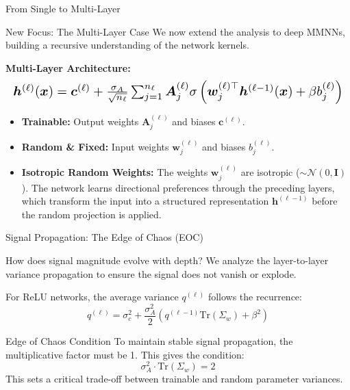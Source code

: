 \documentclass{beamer}
\begin{document}
\begin{frame}{From Single to Multi-Layer}
\begin{alertblock}{New Focus: The Multi-Layer Case}
We now extend the analysis to deep MMNNs, building a recursive understanding of the network kernels.
\end{alertblock}
\vspace{1em}
\textbf{Multi-Layer Architecture:}
\begin{equation*}
\resizebox{\hsize}{!}{$
\bm{h}^{(\ell)}(\bm{x}) = \bm{c}^{(\ell)} + \frac{\sigma_A}{\sqrt{n_\ell}} \sum_{j=1}^{n_\ell} \bm{A}_j^{(\ell)} \sigma\left(\bm{w}_j^{(\ell)\top} \bm{h}^{(\ell-1)}(\bm{x}) + \beta b_j^{(\ell)}\right)
$}
\end{equation*}
\begin{itemize}
    \item \textbf{Trainable:} Output weights $\bm{A}_j^{(\ell)}$ and biases $\bm{c}^{(\ell)}$.
    \item \textbf{Random \& Fixed:} Input weights $\bm{w}_j^{(\ell)}$ and biases $b_j^{(\ell)}$.
    \item \textbf{Isotropic Random Weights:} The weights $\bm{w}_j^{(\ell)}$ are isotropic ($\sim\mathcal{N}(0, \mathbf{I})$). The network learns directional preferences through the preceding layers, which transform the input into a structured representation $\bm{h}^{(\ell-1)}$ before the random projection is applied.
\end{itemize}
\end{frame}

\begin{frame}{Signal Propagation: The Edge of Chaos (EOC)}
\begin{block}{How does signal magnitude evolve with depth?}
We analyze the layer-to-layer variance propagation to ensure the signal does not vanish or explode.
\end{block}
For ReLU networks, the average variance $q^{(\ell)}$ follows the recurrence:
\begin{equation*}
    q^{(\ell)} = \sigma_c^2 + \frac{\sigma_A^2}{2} \left( q^{(\ell-1)}\text{Tr}(\Sigma_w) + \beta^2 \right)
\end{equation*}
\begin{alertblock}{Edge of Chaos Condition}
To maintain stable signal propagation, the multiplicative factor must be 1. This gives the condition:
\begin{equation*}
    \sigma_A^2 \cdot \text{Tr}(\Sigma_w) = 2
\end{equation*}
This sets a critical trade-off between trainable and random parameter variances.
\end{alertblock}
\end{frame}
\end{document}
